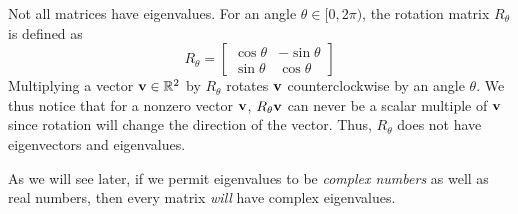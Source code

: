 \documentclass[mathshortcuts, colorful]{notes}
\begin{document}
    \begin{example}
        Not all matrices have eigenvalues. For an angle $\theta \in [0, 2\pi)$, the rotation matrix $R_\theta$ is defined as 
        \begin{equation*}
            R_\theta = \begin{bmatrix}
                \cos \theta & -\sin \theta \\ \sin \theta & \cos \theta
            \end{bmatrix}
        \end{equation*}
        Multiplying a vector $\mathbf{v} \in \mathbb{R}^2$ by $R_\theta$ rotates $\mathbf{v}$ counterclockwise by an angle $\theta$. We thus notice that for a nonzero vector $\mathbf{v}$, $R_\theta \mathbf{v}$ can never be a scalar multiple of $\mathbf{v}$ since rotation will change the direction of the vector. Thus, $R_\theta$ does not have eigenvectors and eigenvalues. 

        As we will see later, if we permit eigenvalues to be \emph{complex numbers} as well as real numbers, then every matrix \emph{will} have complex eigenvalues.
    \end{example}
\end{document}
